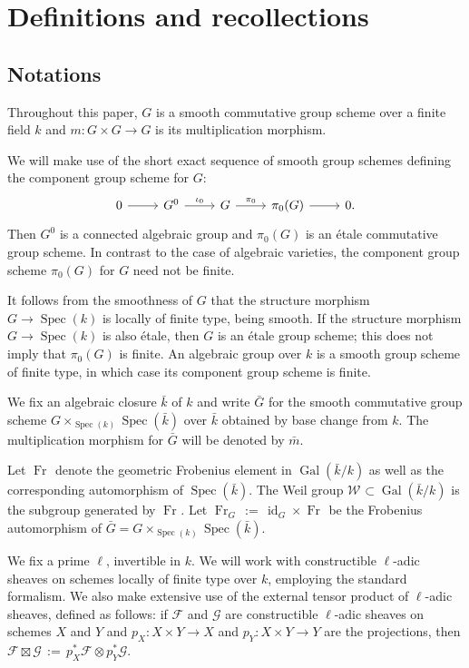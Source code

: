 \documentclass[10pt]{amsart}
\theoremstyle{plain}
\theoremstyle{definition}
\newcommand{\bFq}{\bar{k}}
\newcommand{\Fq}{k}
\newcommand{\Weil}[1]{\mathcal{W}_{#1}}
\DeclareMathOperator{\Gal}{Gal}
\newcommand{\Frob}[1]{\operatorname{Fr}_{#1}}
\DeclareMathOperator{\id}{id}
\newcommand{\Spec}[1]{{\operatorname{Spec}(#1)}}
\newcommand{\ceq}{{\, :=\, }}
\newcommand{\bm}{\bar{m}}
\newcommand{\bG}{\bar{G}}
\begin{document}
\tableofcontents

\section{Definitions and recollections} \label{sec:category}

\subsection{Notations}\label{ssec:notation}

Throughout this paper, $G$ is a smooth commutative group scheme
over a finite field $\Fq$ and $m : G \times G\to G$ is its multiplication morphism.

We will make use of the short exact sequence of smooth group schemes defining the component group scheme for $G$:
\[
\begin{tikzcd}
0 \rar & G^0 \arrow{r}{\iota_0} & G \arrow{r}{\pi_0} & \pi_0(G) \rar & 0.
\end{tikzcd}
\]
Then $G^0$ is a connected algebraic group and $\pi_0(G)$ is an \'etale commutative group scheme.
In contrast to the case of algebraic varieties, the component group scheme $\pi_0(G)$ for $G$ need not be finite.

It follows from the smoothness of $G$ that the structure morphism $G \to \Spec{\Fq}$ is locally of finite type, being smooth.
If the structure morphism $G \to \Spec{\Fq}$ is also \'etale, then $G$ is an \'etale group scheme; this does not imply that $\pi_0(G)$ is finite.
An algebraic group over $\Fq$ is a smooth group scheme of finite type, in which case its component group scheme is finite.

We fix an algebraic closure $\bFq$ of $\Fq$ and write $\bG$ for the
smooth commutative group scheme $G \times_{\Spec{\Fq}} \Spec{\bFq}$ over $\bFq$
obtained by base change from $k$. The multiplication morphism for $\bG$ will be denoted by $\bm$.

Let $\Frob{}$ denote the geometric Frobenius element in $\Gal(\bFq/\Fq)$ as
well as the corresponding automorphism of $\Spec{\bFq}$. The Weil group
$\Weil{}\subset \Gal(\bFq/\Fq)$ is the subgroup generated by $\Frob{}$.
Let $\Frob{G} \ceq \id_{G} \times \Frob{}$ be the Frobenius automorphism of $\bG = G \times_{\Spec{\Fq}} \Spec{\bFq}$.

We fix a prime $\ell$, invertible in $\Fq$.
We will work with constructible $\ell$-adic sheaves 
on schemes locally of finite type over $\Fq$, employing the standard formalism.
We also make extensive use of the external tensor product of $\ell$-adic sheaves,
defined as follows: if $\mathcal{F}$ and $\mathcal{G}$ are constructible $\ell$-adic
sheaves on schemes $X$ and $Y$ and $p_X : X\times Y\to X$ and $p_Y : X\times Y \to Y$
are the projections, then $\mathcal{F}\boxtimes \mathcal{G} \ceq p_X^* \mathcal{F} \otimes p_Y^*\mathcal{G}$.
\end{document}
